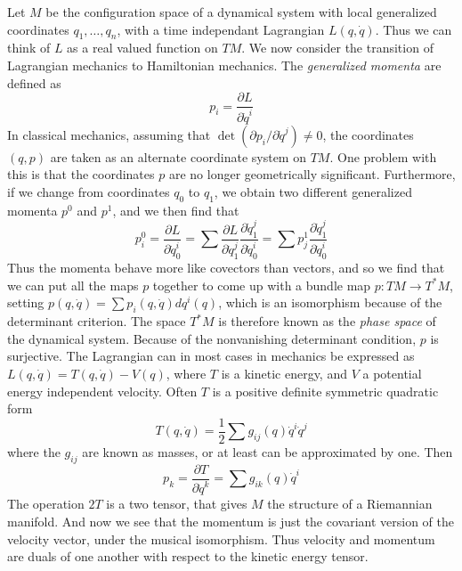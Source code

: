 \begin{example}
    Let $M$ be the configuration space of a dynamical system with local generalized coordinates $q_1, \dots, q_n$, with a time independant Lagrangian $L(q,\dot{q})$. Thus we can think of $L$ as a real valued function on $TM$. We now consider the transition of Lagrangian mechanics to Hamiltonian mechanics. The {\it generalized momenta} are defined as
    \[ p_i = \frac{\partial L}{\partial \dot{q}^i} \]
    In classical mechanics, assuming that $\det(\partial p_i/\partial \dot{q}^j) \neq 0$, the coordinates $(q,p)$ are taken as an alternate coordinate system on $TM$. One problem with this is that the coordinates $p$ are no longer geometrically significant. Furthermore, if we change from coordinates $q_0$ to $q_1$, we obtain two different generalized momenta $p^0$ and $p^1$, and we then find that
    \[ p^0_i = \frac{\partial L}{\partial \dot{q}_0^i} = \sum \frac{\partial L}{\partial \dot{q}_1^j} \frac{\partial \dot{q}_1^j}{\partial \dot{q}_0^i} = \sum p^1_j \frac{\partial \dot{q}_1^j}{\partial \dot{q}_0^i} \]
    Thus the momenta behave more like covectors than vectors, and so we find that we can put all the maps $p$ together to come up with a bundle map $p: TM \to T^*M$, setting $p(q,\dot{q}) = \sum p_i(q, \dot{q}) dq^i(q)$, which is an isomorphism because of the determinant criterion. The space $T^*M$ is therefore known as the {\it phase space} of the dynamical system. Because of the nonvanishing determinant condition, $p$ is surjective. The Lagrangian can in most cases in mechanics be expressed as $L(q,\dot{q}) = T(q,\dot{q}) - V(q)$, where $T$ is a kinetic energy, and $V$ a potential energy independent velocity. Often $T$ is a positive definite symmetric quadratic form
    \[ T(q,\dot{q}) = \frac{1}{2} \sum g_{ij}(q) \dot{q}^i \dot{q}^j \]
    where the $g_{ij}$ are known as masses, or at least can be approximated by one. Then
    \[ p_k = \frac{\partial T}{\partial \dot{q}^k} = \sum g_{ik}(q) \dot{q}^i \]
    The operation $2T$ is a two tensor, that gives $M$ the structure of a Riemannian manifold. And now we see that the momentum is just the covariant version of the velocity vector, under the musical isomorphism. Thus velocity and momentum are duals of one another with respect to the kinetic energy tensor.


\end{example}
